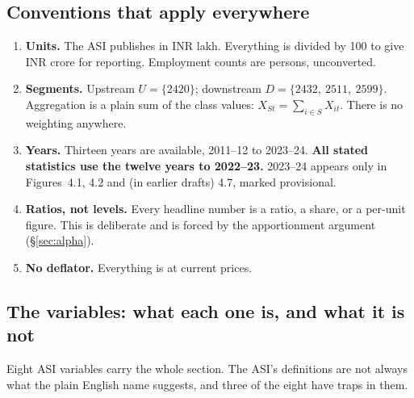 \documentclass[11pt, a4paper]{article}
\begin{document}
\subsection{Conventions that apply everywhere}

\begin{enumerate}[label=\textbf{C\arabic*.}, leftmargin=2.5em, itemsep=2pt]
\item \textbf{Units.} The ASI publishes in INR lakh. Everything is divided by 100 to
give INR crore for reporting. Employment counts are persons, unconverted.
\item \textbf{Segments.} Upstream $U = \{2420\}$; downstream
$D = \{2432,\ 2511,\ 2599\}$. Aggregation is a plain sum of the class values:
$X_{St} = \sum_{i \in S} X_{it}$. There is no weighting anywhere.
\item \textbf{Years.} Thirteen years are available, 2011--12 to 2023--24. \textbf{All
stated statistics use the twelve years to 2022--23.} 2023--24 appears only in
Figures~4.1, 4.2 and (in earlier drafts) 4.7, marked provisional.
\item \textbf{Ratios, not levels.} Every headline number is a ratio, a share, or a
per-unit figure. This is deliberate and is forced by the apportionment argument
(§\ref{sec:alpha}).
\item \textbf{No deflator.} Everything is at current prices.
\end{enumerate}

\subsection{The variables: what each one is, and what it is not}
\label{sec:vars}

Eight ASI variables carry the whole section. The ASI's definitions are not always what
the plain English name suggests, and three of the eight have traps in them.
\end{document}
